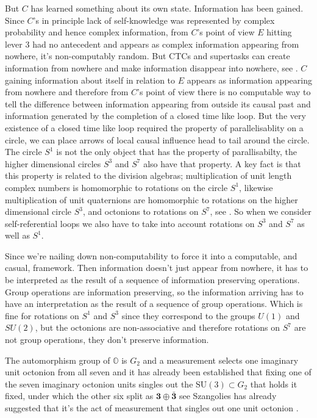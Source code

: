 \documentclass{article}
\begin{document}
But $C$ has learned something about its own state. Information has been gained. Since $C$'s in principle lack of self-knowledge was represented by complex probability and hence complex information, from $C$'s point of view $E$ hitting lever 3 had no antecedent and appears as complex information appearing from nowhere, it's non-computably random. But CTCs and supertasks can create information from nowhere and make information disappear into nowhere, see \autocite{Deutsch_91, Laraudogoitia_1997, Laraudogoitia1998}. $C$ gaining information about itself in relation to $E$ appears as information appearing from nowhere and therefore from $C$'s point of view there is no computable way to tell the difference between information appearing from outside its causal past and information generated by the completion of a closed time like loop. But the very existence of a closed time like loop required the property of parallelisablity on a circle, we can place arrows of local causal influence head to tail around the circle. The circle $S^1$ is not the only object that has the property of parallisabilty, the higher dimensional circles $S^3$ and $S^7$ also have that property. A key fact is that this property is related to the division algebras; multiplication of unit length complex numbers is homomorphic to rotations on the circle $S^1$, likewise multiplication of unit quaternions are homomorphic to rotations on the higher dimensional circle $S^3$, and octonions to rotations on $S^7$, see \autocite{baez_2002}. So when we consider self-referential loops we also have to take into account rotations on $S^3$ and $S^7$ as well as $S^1$. 

Since we're nailing down non-computability to force it into a computable, and casual, framework. Then information doesn't just appear from nowhere, it has to be interpreted as the result of a sequence of information preserving operations. Group operations are information preserving, so the information arriving has to have an interpretation as the result of a sequence of group operations. Which is fine for rotations on $S^1$ and $S^3$ since they correspond to the groups $U(1)$ and $SU(2)$, but the octonions are non-associative and therefore rotations on $S^7$ are not group operations, they don't preserve information. 

The automorphism group of $\mathbb{O}$ is $G_2$ and a measurement selects one imaginary unit octonion from all seven and it has already been established that fixing one of the seven imaginary octonion units singles out the $\mathrm{SU}(3) \subset G_2$ that holds it fixed, under which the other six split as $\mathbf{3} \oplus \bar{\mathbf{3}}$ see \autocite{gunaydin_1973, conway_2003} Szangolies has already suggested that it's the act of measurement that singles out one unit octonion \autocite{szangolies_2025}. 
\end{document}
